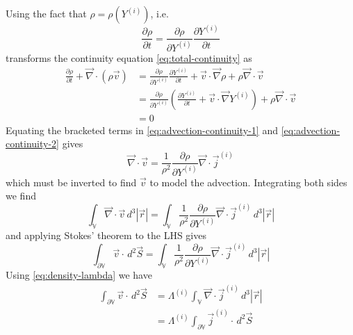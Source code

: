 \documentclass[11pt,twoside]{report}
\begin{document}
Using the fact that $\rho = \rho(Y^{(i)})$, i.e.\
\begin{equation*}
  \frac{\partial \rho}{\partial t} =
  \frac{\partial \rho}{\partial Y^{(i)}} \frac{\partial Y^{(i)}}{\partial t}
\end{equation*}
transforms the continuity equation \eqref{eq:total-continuity} as
\begin{equation}\label{eq:advection-continuity-2}
  \begin{aligned}
    \frac{\partial \rho}{\partial t} +
    \vec{\nabla} \cdot (\rho \vec{v})
    &=
    \frac{\partial \rho}{\partial Y^{(i)}} \frac{\partial Y^{(i)}}{\partial t} +
    \vec{v} \cdot \vec{\nabla} \rho +
    \rho \vec{\nabla} \cdot \vec{v} \\
    &=
    \frac{\partial \rho}{\partial Y^{(i)}}
    \left(
    \frac{\partial Y^{(i)}}{\partial t} +
    \vec{v} \cdot \vec{\nabla} Y^{(i)}
    \right) +
    \rho \vec{\nabla} \cdot \vec{v} \\
    &= 0
  \end{aligned}
\end{equation}
Equating the bracketed terms in \eqref{eq:advection-continuity-1} and \eqref{eq:advection-continuity-2} gives
\begin{equation}
  \vec{\nabla} \cdot \vec{v}
  =
  \frac{1}{\rho^2}
  \frac{\partial \rho}{\partial Y^{(i)}}
  \vec{\nabla} \cdot \vec{j}^{(i)}
\end{equation}
which must be inverted to find $\vec{v}$ to model the advection.
Integrating both sides we find
\begin{equation*}
  \int_{\mathbb{V}}
  \vec{\nabla} \cdot \vec{v}
  \, d^3|\vec{r}|
  =
  \int_{\mathbb{V}}
  \frac{1}{\rho^2}
  \frac{\partial \rho}{\partial Y^{(i)}}
  \vec{\nabla} \cdot \vec{j}^{(i)}
  \, d^3|\vec{r}|
\end{equation*}
and applying Stokes' theorem to the LHS gives
\begin{equation*}
  \int_{\partial \mathbb{V}}
  \vec{v} \cdot
  \, d^2\vec{S}
  =
  \int_{\mathbb{V}}
  \frac{1}{\rho^2}
  \frac{\partial \rho}{\partial Y^{(i)}}
  \vec{\nabla} \cdot \vec{j}^{(i)}
  \, d^3|\vec{r}|
\end{equation*}
Using \eqref{eq:density-lambda} we have
\begin{equation*}
  \begin{aligned}
  \int_{\partial \mathbb{V}}
  \vec{v} \cdot
  \, d^2\vec{S}
  &=
  \Lambda^{(i)}
  \int_{\mathbb{V}}
  \vec{\nabla} \cdot \vec{j}^{(i)}
  \, d^3|\vec{r}| \\
  &=
  \Lambda^{(i)}
  \int_{\partial \mathbb{V}}
  \vec{j}^{(i)} \cdot
  \, d^2\vec{S}
  \end{aligned}
\end{equation*}
\end{document}

